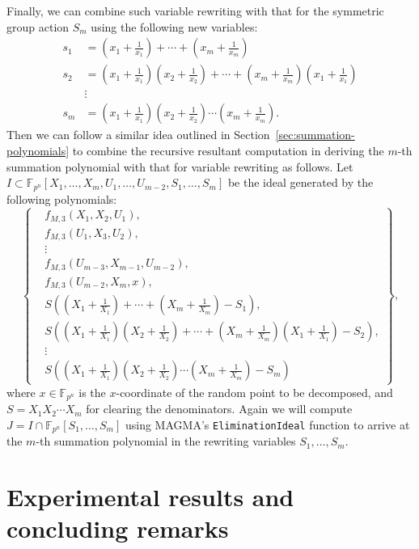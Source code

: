 \documentclass{llncs}
\newcommand{\F}[1]{\ensuremath{\mathbb F_{#1}}}
\begin{document}
Finally, we can combine such variable rewriting with that for the
symmetric group action $S_m$ using the following new variables:
%
\begin{align*}
  s_1 & = (x_1+\frac{1}{x_1})+\cdots+(x_m+\frac{1}{x_m}) \\
  s_2 & = (x_1+\frac{1}{x_1})(x_2+\frac{1}{x_2})+\cdots+(x_m+\frac{1}{x_m})(x_1+\frac{1}{x_1}) \\
      &\vdots \\
  s_m & = (x_1+\frac{1}{x_1})(x_2+\frac{1}{x_2})\cdots(x_m+\frac{1}{x_m}).
\end{align*}
%
Then we can follow a similar idea outlined in
Section~\ref{sec:summation-polynomials} to combine the recursive
resultant computation in deriving the $m$-th summation polynomial with
that for variable rewriting as follows.
%
Let
$I\subset\F{p^n}[X_1,\ldots,X_m,U_1,\ldots,U_{m-2},S_1,\ldots,S_m]$ be
the ideal generated by the following polynomials:
%
\[ \left\{\begin{aligned}
      & f_{M,3}(X_1,X_2,U_1), \\
      & f_{M,3}(U_1,X_3,U_2), \\
      & \vdots \\
      & f_{M,3}(U_{m-3},X_{m-1},U_{m-2}), \\
      & f_{M,3}(U_{m-2},X_m,x), \\
      & S\left((X_1+\frac{1}{X_1})+\cdots+(X_m+\frac{1}{X_m}) -
        S_1\right), \\
      &
      S\left((X_1+\frac{1}{X_1})(X_2+\frac{1}{X_2})+\cdots+(X_m+\frac{1}{X_m})(X_1+\frac{1}{X_1})
        - S_2\right), \\
      & \vdots \\
      &
      S\left((X_1+\frac{1}{X_1})(X_2+\frac{1}{X_2})\cdots(X_m+\frac{1}{X_m})
        - S_m\right)
\end{aligned}\right\}, \]
where $x\in\F{p^n}$ is the $x$-coordinate of the random point to be
decomposed, and $S=X_1X_2\cdots X_m$ for clearing the denominators.
%
Again we will compute $J=I\cap\F{p^n}[S_1,\ldots,S_m]$ using MAGMA's
\texttt{EliminationIdeal} function to arrive at the $m$-th summation
polynomial in the rewriting variables $S_1,\ldots,S_m$.

\section{Experimental results and concluding remarks}\label{sec:experimental-results}
%
\end{document}
